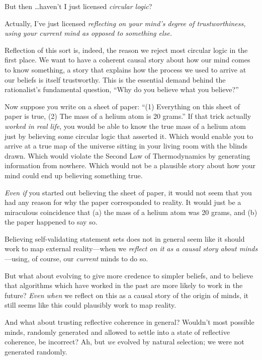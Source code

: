 {
 But then \ldots haven't I just licensed
\textit{circular logic}?}

{
 Actually, I've just licensed \textit{reflecting on
your mind's degree of trustworthiness, using your
current mind as opposed to something else.}}

{
 Reflection of this sort is, indeed, the reason we reject most
circular logic in the first place. We want to have a coherent causal
story about how our mind comes to know something, a story that explains
how the process we used to arrive at our beliefs is itself trustworthy.
This is the essential demand behind the rationalist's
fundamental question, ``Why do you believe what you
believe?''}

{
 Now suppose you write on a sheet of paper: ``(1)
Everything on this sheet of paper is true, (2) The mass of a helium
atom is 20 grams.'' If that trick actually
\textit{worked in real life}, you would be able to know the true mass
of a helium atom just by believing some circular logic that asserted
it. Which would enable you to arrive at a true map of the universe
sitting in your living room with the blinds drawn. Which would violate
the Second Law of Thermodynamics by generating information from
nowhere. Which would not be a plausible story about how your mind could
end up believing something true.}

{
 \textit{Even if} you started out believing the sheet of paper, it
would not seem that you had any reason for why the paper corresponded
to reality. It would just be a miraculous coincidence that (a) the mass
of a helium atom was 20 grams, and (b) the paper happened to say so.}

{
 Believing self-validating statement sets does not in general seem
like it should work to map external reality---when we \textit{reflect
on it as a causal story about minds}{}---using, of course, our
\textit{current} minds to do so.}

{
 But what about evolving to give more credence to simpler beliefs,
and to believe that algorithms which have worked in the past are more
likely to work in the future? \textit{Even when} we reflect on this as
a causal story of the origin of minds, it still seems like this could
plausibly work to map reality.}

{
 And what about trusting reflective coherence in general?
Wouldn't most possible minds, randomly generated and
allowed to settle into a state of reflective coherence, be incorrect?
Ah, but \textit{we} evolved by natural selection; we were not generated
randomly.}

